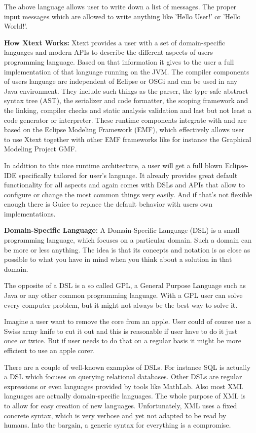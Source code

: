	The above language allows user to write down a list of messages. The proper input messages which are allowed to write anything like 'Hello User!' or 'Hello World!'.

		
	\textbf{How Xtext Works:}
	Xtext provides a user with a set of domain-specific languages and modern APIs to describe the different aspects of users programming language. Based on that information it gives to the user a full implementation of that language running on the JVM. The compiler components of users language are independent of Eclipse or OSGi and can be used in any Java environment. They include such things as the parser, the type-safe abstract syntax tree (AST), the serializer and code formatter, the scoping framework and the linking, compiler checks and static analysis validation and last but not least a code generator or interpreter. These runtime components integrate with and are based on the Eclipse Modeling Framework (EMF), which effectively allows user to use Xtext together with other EMF frameworks like for instance the Graphical Modeling Project GMF.
	
	In addition to this nice runtime architecture, a user will get a full blown Eclipse-IDE specifically tailored for user's language. It already provides great default functionality for all aspects and again comes with DSLs and APIs that allow to configure or change the most common things very easily. And if that's not flexible enough there is Guice to replace the default behavior with users own implementations.
	
	\textbf{Domain-Specific Language:}
	A Domain-Specific Language (DSL) is a small programming language, which focuses on a particular domain. Such a domain can be more or less anything. The idea is that its concepts and notation is as close as possible to what you have in mind when you think about a solution in that domain. 
		
	The opposite of a DSL is a so called GPL, a General Purpose Language such as Java or any other common programming language. With a GPL user can solve every computer problem, but it might not always be the best way to solve it.
	
	Imagine a user want to remove the core from an apple. User could of course use a Swiss army knife to cut it out and this is reasonable if user have to do it just once or twice. But if user needs to do that on a regular basis it might be more efficient to use an apple corer.
	
	There are a couple of well-known examples of DSLs. For instance SQL is actually a DSL which focuses on querying relational databases. Other DSLs are regular expressions or even languages provided by tools like MathLab. Also most XML languages are actually domain-specific languages. The whole purpose of XML is to allow for easy creation of new languages. Unfortunately, XML uses a fixed concrete syntax, which is very verbose and yet not adapted to be read by humans. Into the bargain, a generic syntax for everything is a compromise.
	
